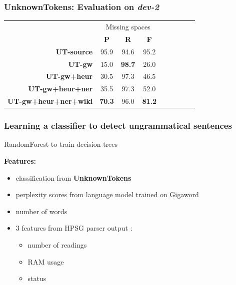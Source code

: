 \documentclass[table]{beamer}
\begin{document}
\begin{frame}
  \frametitle{\textbf{UnknownTokens}: Evaluation on \textit{dev-2}}
  \begin{tabular}{r|c|c|c|c|c|c|c|c|}
  & \multicolumn{3}{c|}{Missing spaces}\\
  & \textbf{P} & \textbf{R} & \textbf{F}\\
  \hline
  \textbf{UT-source} & 95.9 & 94.6 & 95.2\\
  \hline\hline\pause
  \textbf{UT-gw} & 15.0 & \textbf{98.7} & 26.0\\
  \hline\pause
  \textbf{UT-gw+heur} & 30.5 & 97.3 & 46.5\\
  \hline\pause
  \textbf{UT-gw+heur+ner} & 35.5 & 97.3 & 52.0\\
  \hline\pause
  \textbf{UT-gw+heur+ner+wiki} & \textbf{70.3} & 96.0 & \textbf{81.2}\\
  \hline
  \end{tabular}
\end{frame}

\begin{frame}
  \frametitle{Learning  a classifier to detect ungrammatical sentences}
  RandomForest \citep{breiman2001random} to train decision trees
  \vspace{0.6cm}

  \textbf{Features:}\pause
  \begin{itemize}
    \item classification from \textbf{UnknownTokens}\pause
    \item perplexity scores from language model trained on Gigaword\pause
    \item number of words\pause
    \item 3 features from HPSG parser output \citep{ace,copestake2002implementing}:
    \begin{itemize}
      \item number of readings
      \item RAM usage
      \item status
    \end{itemize}
  \end{itemize}
\end{frame}
\end{document}
